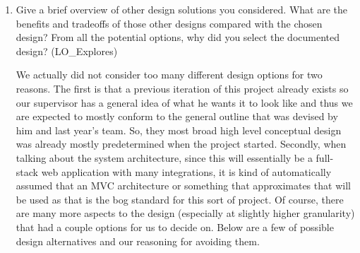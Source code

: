 \documentclass[12pt, titlepage]{article}
\begin{document}
\begin{enumerate}
  \item Give a brief overview of other design solutions you considered.  What
  are the benefits and tradeoffs of those other designs compared with the chosen
  design?  From all the potential options, why did you select the documented design?
  (LO\_Explores)

  We actually did not consider too many different design options for two reasons. The first is that a previous iteration of this project already
  exists so our supervisor has a general idea of what he wants it to look like and thus we are expected to mostly conform to the general outline
  that was devised by him and last year's team. So, they most broad high level conceptual design was already mostly predetermined when the project started.
  Secondly, when talking about the system architecture, since this will essentially be a full-stack web application with many integrations, it is kind
  of automatically assumed that an MVC architecture or something that approximates that will be used as that is the bog standard for this sort of project.
  Of course, there are many more aspects to the design (especially at slightly higher granularity) that had a couple options for us to decide on. Below are a
  few of possible design alternatives and our reasoning for avoiding them.


\end{enumerate}
\end{document}

